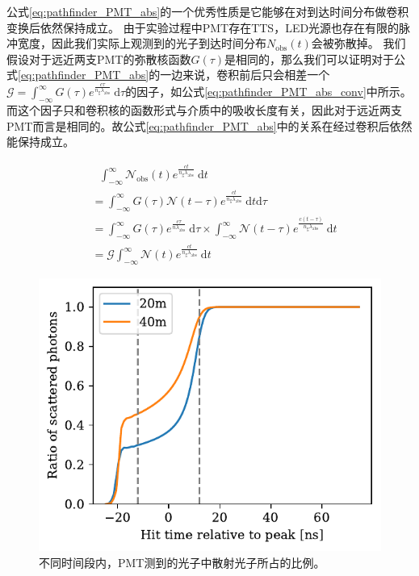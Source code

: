 公式\ref{eq:pathfinder_PMT_abs}的一个优秀性质是它能够在对到达时间分布做卷积变换后依然保持成立。
由于实验过程中PMT存在TTS，LED光源也存在有限的脉冲宽度，因此我们实际上观测到的光子到达时间分布$N_\mathrm{obs}(t)$会被弥散掉。
我们假设对于远近两支PMT的弥散核函数$G(\tau)$是相同的，那么我们可以证明对于公式\ref{eq:pathfinder_PMT_abs}的一边来说，卷积前后只会相差一个$\mathcal{G} = \int_{-\infty}^{\infty} G(\tau) e^{\frac{c\tau}{n_\mathrm{g} \lambda_\mathrm{abs}}} ~\mathrm{d}\tau$的因子，如公式\ref{eq:pathfinder_PMT_abs_conv}中所示。
而这个因子只和卷积核的函数形式与介质中的吸收长度有关，因此对于远近两支PMT而言是相同的。故公式\ref{eq:pathfinder_PMT_abs}中的关系在经过卷积后依然能保持成立。

\begin{equation}
    \begin{aligned}
    & ~~~\int_{-\infty}^{\infty} \mathcal{N}_\mathrm{obs}(t) e^{\frac{ct}{n_\mathrm{g} \lambda_\mathrm{abs}}} ~\mathrm{d}t \\
    &= \int_{-\infty}^{\infty} G(\tau) \mathcal{N}(t-\tau) e^{\frac{ct}{n_\mathrm{g} \lambda_\mathrm{abs}}} ~\mathrm{d}t \mathrm{d}\tau \\
    &= \int_{-\infty}^{\infty} G(\tau) e^{\frac{c\tau}{n\lambda_\mathrm{abs}}} ~\mathrm{d}\tau \times
    \int_{-\infty}^{\infty} \mathcal{N}(t-\tau) e^{\frac{c(t-\tau)}{n_\mathrm{g} \lambda_\mathrm{abs}}} ~\mathrm{d}t \\
    &= \mathcal{G} \int_{-\infty}^{\infty} \mathcal{N}(t) e^{\frac{ct}{n_\mathrm{g} \lambda_\mathrm{abs}}} ~\mathrm{d}t
    \label{eq:pathfinder_PMT_abs_conv}
    \end{aligned}
\end{equation}

\begin{figure}[!ht]
    \centering
    \includegraphics[width=0.65\linewidth]{img/pathfinder_sim_PMT_sca_ratio.pdf}
    \caption{不同时间段内，PMT测到的光子中散射光子所占的比例。}
    \label{fig:pathfinder_sim_PMT_sca_ratio}
\end{figure}


